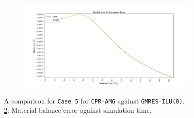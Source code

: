 \begin{figure}
\centering
\begin{subfigure}[b]{\textwidth}
   \includegraphics[width=1\linewidth]{figures/viscous/20x20/matbalerr_time.pdf}
   \caption{}
   \label{viscous20_matbalerr}
\end{subfigure}

\caption[caption]{A comparison for \texttt{Case 5} for \texttt{CPR-AMG} against \texttt{GMRES-ILU(0)}.\\\hspace{\textwidth}
	\cref{viscous20_matbalerr}: Material balance error against simulation time. \\\hspace{\textwidth}}
\end{figure}
